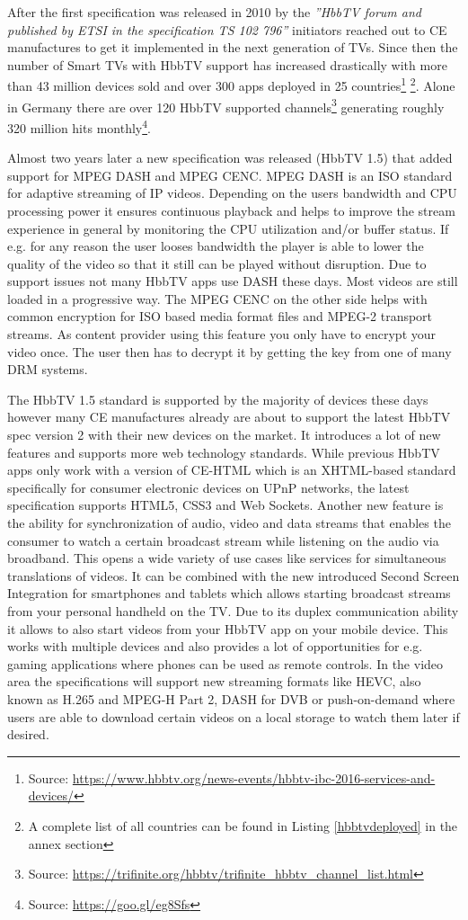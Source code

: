 After the first specification was released in 2010 by the \textit{''HbbTV forum and published by ETSI
in the specification TS 102 796''} \cite{evolution} initiators reached out to CE manufactures to get
it implemented in the next generation of TVs. Since then the number of Smart TVs with HbbTV support has
increased drastically with more than 43 million devices sold and over 300 apps deployed in 25
countries\footnote{Source: \url{https://www.hbbtv.org/news-events/hbbtv-ibc-2016-services-and-devices/}}
\footnote{A complete list of all countries can be found in Listing \ref{hbbtvdeployed} in the annex section}.
Alone in Germany there are over 120 HbbTV supported channels\footnote{Source: \url{https://trifinite.org/hbbtv/trifinite_hbbtv_channel_list.html}}
generating roughly 320 million hits monthly\footnote{Source: \url{https://goo.gl/eg8Sfs}}.

Almost two years later a new specification was released (HbbTV 1.5) that added support for MPEG DASH
and MPEG CENC. MPEG DASH is an ISO standard for adaptive streaming of IP videos. Depending on the
users bandwidth and CPU processing power it ensures continuous playback and helps to improve the stream
experience in general by monitoring the CPU utilization and/or buffer status. If e.g. for any reason
the user looses bandwidth the player is able to lower the quality of the video so that it still can
be played without disruption. Due to support issues not many HbbTV apps use DASH these days.
Most videos are still loaded in a progressive way. The MPEG CENC on the other side helps with common
encryption for ISO based media format files and MPEG-2 transport streams. As content provider using this
feature you only have to encrypt your video once. The user then has to decrypt it by getting the
key from one of many DRM systems.

The HbbTV 1.5 standard is supported by the majority of devices these days however many CE manufactures
already are about to support the latest HbbTV spec version 2 with their new devices on the market.
It introduces a lot of new features and supports more web technology standards. While previous HbbTV
apps only work with a version of CE-HTML which is an XHTML-based standard specifically for consumer
electronic devices on UPnP networks, the latest specification supports HTML5, CSS3 and Web Sockets.
Another new feature is the ability for synchronization of audio, video and data streams that enables
the consumer to watch a certain broadcast stream while listening on the audio via broadband. This
opens a wide variety of use cases like services for simultaneous translations of videos. It can be
combined with the new introduced Second Screen Integration for smartphones and tablets which
allows starting broadcast streams from your personal handheld on the TV. Due to its duplex
communication ability it allows to also start videos from your HbbTV app on your mobile device.
This works with multiple devices and also provides a lot of opportunities for e.g. gaming applications
where phones can be used as remote controls. In the video area the specifications will support
new streaming formats like HEVC, also known as H.265 and MPEG-H Part 2, DASH for DVB or
push-on-demand where users are able to download certain videos on a local storage to watch them
later if desired.

